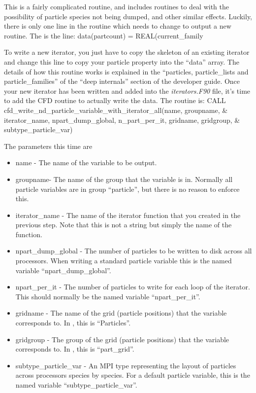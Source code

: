\documentclass[12pt,a4paper]{article}
\newcommand{\EPOCH}{{\color{warwickdark}\fontfamily{phv}\selectfont{EPOCH}}}
\newenvironment{boxverbatim}{\lboxverbatim{none}}{\endlboxverbatim}
\begin{document}
This is a fairly complicated routine, and includes routines to deal with the
possibility of particle species not being dumped, and other similar
effects. Luckily, there is only one line in the routine which needs to change
to output a new routine. The is the line:
\begin{boxverbatim}
  data(partcount) = REAL(current_family%
\end{boxverbatim}

To write a new iterator, you just have to copy the skeleton of an existing
iterator and change this line to copy your particle property into the ``data''
array. The details of how this routine works is explained in the ``particles,
particle\_lists and particle\_families'' of the ``deep internals'' section of
the developer guide. Once your new iterator has been written and added into the
{\it iterators.F90} file, it's time to add the CFD routine to actually write
the data. The routine is:
\begin{boxverbatim}
CALL cfd_write_nd_particle_variable_with_iterator_all(name, groupname, &
    iterator_name, npart_dump_global, n_part_per_it, gridname, gridgroup, &
    subtype_particle_var)
\end{boxverbatim}

The parameters this time are
\begin{itemize}
\item name - The name of the variable to be output.
\item groupname- The name of the group that the variable is in. Normally all
  {\EPOCH} particle variables are in group ``particle'', but there is no reason
  to enforce this.
\item iterator\_name - The name of the iterator function that you created in
  the previous step. Note that this is not a string but simply the name of the
  function.
\item npart\_dump\_global - The number of particles to be written to disk
  across all processors. When writing a standard particle variable this is the
  named variable ``npart\_dump\_global''.
\item npart\_per\_it - The number of particles to write for each loop of the
  iterator. This should normally be the named variable ``npart\_per\_it''.
\item gridname - The name of the grid (particle positions) that the variable
  corresponds to. In {\EPOCH}, this is ``Particles''.
\item gridgroup - The group of the grid (particle positions) that the variable
  corresponds to. In {\EPOCH}, this is ``part\_grid''.
\item subtype\_particle\_var - An MPI type representing the layout of particles
  across processors species by species. For a default particle variable, this
  is the named variable ``subtype\_particle\_var''.
\end{itemize}
\end{document}
